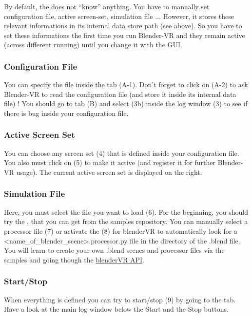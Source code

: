 \documentclass[a4,10pt,openany,oneside]{sphinxmanual}
\begin{document}
By default, the  does not ``know'' anything. You have to manually set configuration file, active screen-set, simulation file ... However, it stores these relevant informations in its internal data store path (see above). So you have to set these informations the first time you run Blender-VR and they remain active (across different running) until you change it with the GUI.


\subsubsection{Configuration File}
\label{components/user-interface:configuration-file}
You can specify the  file inside the  tab (A-1). Don't forget to click on  (A-2) to ask Blender-VR to read the configuration file (and store it inside its internal data file) ! You should go to  tab (B) and select  (3b) inside the log window (3) to see if there is bug inside your configuration file.


\subsubsection{Active Screen Set}
\label{components/user-interface:active-screen-set}
You can choose any screen set (4) that is defined inside your  configuration file. You also must click on  (5) to make it active (and register it for further Blender-VR usage). The current active screen set is displayed on the right.


\subsubsection{Simulation File}
\label{components/user-interface:simulation-file}
Here, you must select the  file you want to load (6). For the beginning, you should try the , that you can get from the samples repository. You can manually select a processor file (7) or activate the  (8) for blenderVR to automatically look for a \textless{}name\_of\_blender\_scene\textgreater{}.processor.py file in the directory of the .blend  file. You will learn to create your own .blend scenes and processor files via the samples and going though the \href{http://blender-vr.readthedocs.org}{blenderVR API}.


\subsubsection{Start/Stop}
\label{components/user-interface:start-stop}
When everything is defined you can try to start/stop (9) by going to the  tab. Have a look at the main log window below the Start and the Stop buttons.
\end{document}
